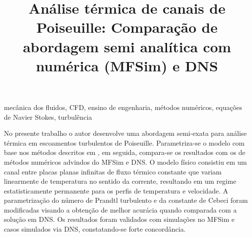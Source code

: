 \documentclass[dissertmst]{ppgco}
\title{Análise térmica de canais de Poiseuille: Comparação de abordagem semi analítica com numérica (MFSim) e DNS}
\begin{document}
\pretextual

\maketitle



\begin{resumo}{mecânica dos fluidos, CFD, ensino de engenharia, métodos numéricos, equações de Navier Stokes, turbulência}

No presente trabalho o autor desenvolve uma abordagem semi-exata para análise térmica em escoamentos turbulentos de Poiseuille. Parametriza-se o modelo com base nos métodos descritos em \cite{felipe1}, em seguida, compara-se os resultados com os de métodos numéricos advindos do MFSim e DNS. O modelo físico consistiu em um canal entre placas planas infinitas de fluxo térmico constante que variam linearmente de temperatura no sentido da corrente, resultando em um regime estatisticamente permanente para os perfis de temperatura e velocidade. A parametrização do número de Prandtl turbulento e da constante de Cebeci foram modificadas visando a obtenção de melhor acurácia quando comparada com a solução em DNS. Os resultados foram validados com simulações no MFSim e casos simulados via DNS, constatando-se forte concordância.

\end{resumo}
\end{document}

